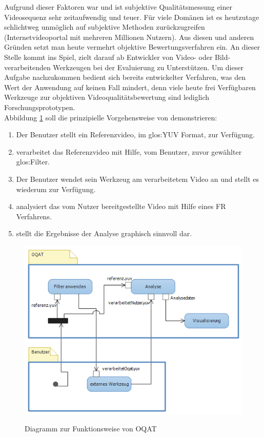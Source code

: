Aufgrund dieser Faktoren war und ist subjektive Qualitätsmessung einer Videosequenz sehr zeitaufwendig und
teuer. Für viele Domänen ist es heutzutage schlichtweg unmöglich auf subjektive Methoden zurückzugreifen
(Internetvideoportal mit mehreren Millionen Nutzern). Aus diesen und anderen Gründen setzt man heute 
vermehrt objektive Bewertungsverfahren ein.
\newpage
An dieser Stelle kommt \projektTitel ins Spiel, \projektTitel zielt darauf ab Entwickler von
Video- oder Bild-verarbeitenden Werkzeugen bei der Evaluierung zu Unterstützen. Um dieser Aufgabe
nachzukommen bedient sich \projektTitel bereits entwickelter Verfahren, was den Wert der Anwendung
auf keinen Fall mindert, denn viele heute frei Verfügbaren Werkzeuge zur objektiven Videoqualitätsbewertung
sind lediglich Forschungsprototypen. \\
Abbildung \ref{grobFunk} soll die prinzipielle Vorgehensweise von \projektTitel demonstrieren:
\begin{enumerate}
\item Der Benutzer stellt \projektTitel ein Referenzvideo, im \gls{glos:YUV} Format, zur Verfügung.
\item \projektTitel verarbeitet das Referenzvideo mit Hilfe, vom Benutzer, zuvor  gewählter \gls{glos:Filter}.
\item Der Benutzer wendet sein Werkzeug am verarbeitetem Video an und stellt es wiederum  \projektTitel zur Verfügung.
\item \projektTitel analysiert das vom Nutzer bereitgestellte Video mit Hilfe eines \gls{FR} Verfahrens.
\item \projektTitel stellt die Ergebnisse der Analyse graphisch sinnvoll dar.
\end{enumerate}
\begin{figure}[h]
\includegraphics[scale=1]{bilder/einleitung.png}
\label{grobFunk}
\caption{Diagramm zur Funktionsweise von \gls{OQAT}}
\end{figure}

